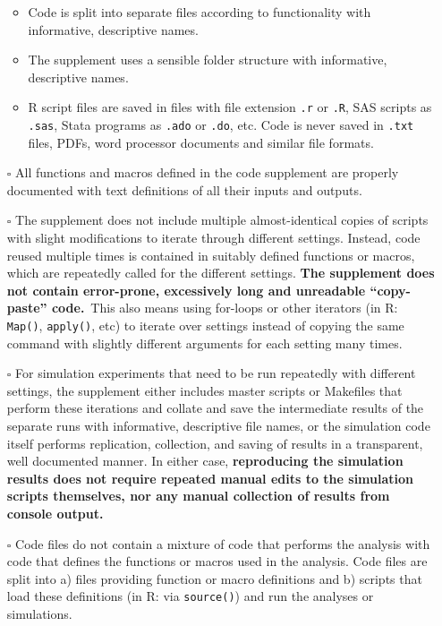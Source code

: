 \documentclass[
  paper=a4,
  ,captions=tableheading
]{scrartcl}
\providecommand{\tightlist}{%
  \setlength{\itemsep}{0pt}\setlength{\parskip}{0pt}}
\let\oldtexttt\texttt
\renewcommand{\texttt}[1]{\colorbox{bgcolor}{\small \oldtexttt{#1}}}
\begin{document}
\begin{itemize}
  \begin{itemize}
  \tightlist
  \item
    Code is split into separate files according to functionality with informative, descriptive names.
  \item
    The supplement uses a sensible folder structure with informative, descriptive names.
  \item
    R script files are saved in files with file extension \texttt{.r} or \texttt{.R}, SAS scripts as \texttt{.sas}, Stata programs as \texttt{.ado} or \texttt{.do}, etc. Code is never saved in \texttt{.txt} files, PDFs, word processor documents and similar file formats.
  \end{itemize}
\item[$\square$]
  All functions and macros defined in the code supplement are properly documented with text definitions of all their inputs and outputs.
\item[$\square$]
  The supplement does not include multiple almost-identical copies of scripts with slight modifications to iterate through different settings. Instead, code reused multiple times is contained in suitably defined functions or macros, which are repeatedly called for the different settings. \textbf{The supplement does not contain error-prone, excessively long and unreadable ``copy-paste'' code.}~This also means using for-loops or other iterators (in R: \texttt{Map()}, \texttt{apply()}, etc) to iterate over settings instead of copying the same command with slightly different arguments for each setting many times.
\item[$\square$]
  For simulation experiments that need to be run repeatedly with different settings, the supplement either includes master scripts or Makefiles that perform these iterations and collate and save the intermediate results of the separate runs with informative, descriptive file names, or the simulation code itself performs replication, collection, and saving of results in a transparent, well documented manner. In either case, \textbf{reproducing the simulation results does not require repeated manual edits to the simulation scripts themselves, nor any manual collection of results from console output.}
\item[$\square$]
  Code files do not contain a mixture of code that performs the analysis with code that defines the functions or macros used in the analysis. Code files are split into a) files providing function or macro definitions and b) scripts that load these definitions (in R: via \texttt{source()}) and run the analyses or simulations.

\end{itemize}
\end{document}
